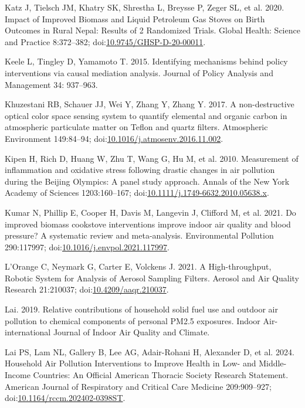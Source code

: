 \documentclass[
  letterpaper,
  DIV=11,
  numbers=noendperiod]{scrartcl}
\newlength{\cslhangindent}
\newenvironment{CSLReferences}[2] %
 {\begin{list}{}{%
  \setlength{\itemindent}{0pt}
  \setlength{\leftmargin}{0pt}
  \setlength{\parsep}{0pt}
  \ifodd #1
   \setlength{\leftmargin}{\cslhangindent}
   \setlength{\itemindent}{-1\cslhangindent}
  \fi
  \setlength{\itemsep}{#2\baselineskip}}}
 {\end{list}}
\begin{document}
\begin{CSLReferences}{1}{1}
Katz J, Tielsch JM, Khatry SK, Shrestha L, Breysse P, Zeger SL, et al.
2020. Impact of {Improved Biomass} and {Liquid Petroleum Gas Stoves} on
{Birth Outcomes} in {Rural Nepal}: {Results} of 2 {Randomized Trials}.
Global Health: Science and Practice 8:372--382;
doi:\href{https://doi.org/10.9745/GHSP-D-20-00011}{10.9745/GHSP-D-20-00011}.

Keele L, Tingley D, Yamamoto T. 2015. Identifying mechanisms behind
policy interventions via causal mediation analysis. Journal of Policy
Analysis and Management 34: 937--963.

Khuzestani RB, Schauer JJ, Wei Y, Zhang Y, Zhang Y. 2017. A
non-destructive optical color space sensing system to quantify elemental
and organic carbon in atmospheric particulate matter on {Teflon} and
quartz filters. Atmospheric Environment 149:84--94;
doi:\href{https://doi.org/10.1016/j.atmosenv.2016.11.002}{10.1016/j.atmosenv.2016.11.002}.

Kipen H, Rich D, Huang W, Zhu T, Wang G, Hu M, et al. 2010. Measurement
of inflammation and oxidative stress following drastic changes in air
pollution during the {Beijing Olympics}: A panel study approach. Annals
of the New York Academy of Sciences 1203:160--167;
doi:\href{https://doi.org/10.1111/j.1749-6632.2010.05638.x}{10.1111/j.1749-6632.2010.05638.x}.

Kumar N, Phillip E, Cooper H, Davis M, Langevin J, Clifford M, et al.
2021. Do improved biomass cookstove interventions improve indoor air
quality and blood pressure? {A} systematic review and meta-analysis.
Environmental Pollution 290:117997;
doi:\href{https://doi.org/10.1016/j.envpol.2021.117997}{10.1016/j.envpol.2021.117997}.

L'Orange C, Neymark G, Carter E, Volckens J. 2021. A {High-throughput},
{Robotic System} for {Analysis} of {Aerosol Sampling Filters}. Aerosol
and Air Quality Research 21:210037;
doi:\href{https://doi.org/10.4209/aaqr.210037}{10.4209/aaqr.210037}.

Lai. 2019. Relative contributions of household solid fuel use and
outdoor air pollution to chemical components of personal {PM2}.5
exposures. Indoor Air-international Journal of Indoor Air Quality and
Climate.

Lai PS, Lam NL, Gallery B, Lee AG, Adair-Rohani H, Alexander D, et al.
2024. Household {Air Pollution Interventions} to {Improve Health} in
{Low-} and {Middle-Income Countries}: {An Official American Thoracic
Society Research Statement}. American Journal of Respiratory and
Critical Care Medicine 209:909--927;
doi:\href{https://doi.org/10.1164/rccm.202402-0398ST}{10.1164/rccm.202402-0398ST}.


\end{CSLReferences}
\end{document}
